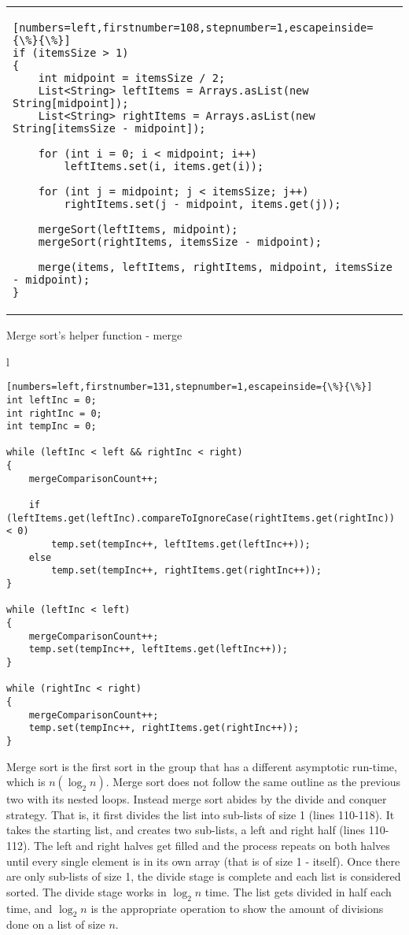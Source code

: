 \documentclass[letterpaper, 10pt,DIV=13]{scrartcl}
\numberwithin{equation}{section} %
\numberwithin{figure}{section} %
\numberwithin{table}{section} %
\begin{document}
\begin{center}
\begin{tabular}{l}
\begin{lstlisting}[numbers=left,firstnumber=108,stepnumber=1,escapeinside={\%}{\%}]
if (itemsSize > 1)
{
    int midpoint = itemsSize / 2;
    List<String> leftItems = Arrays.asList(new String[midpoint]); 
    List<String> rightItems = Arrays.asList(new String[itemsSize - midpoint]);  

    for (int i = 0; i < midpoint; i++)      
        leftItems.set(i, items.get(i));

    for (int j = midpoint; j < itemsSize; j++)          
        rightItems.set(j - midpoint, items.get(j));

    mergeSort(leftItems, midpoint);
    mergeSort(rightItems, itemsSize - midpoint);

    merge(items, leftItems, rightItems, midpoint, itemsSize - midpoint);
}
\end{lstlisting}
\end{tabular}
\end{center}\textbf{}

Merge sort's helper function - merge
\begin{center}
\begin{tabular}{l}
\begin{lstlisting}[numbers=left,firstnumber=131,stepnumber=1,escapeinside={\%}{\%}]
int leftInc = 0;  
int rightInc = 0; 
int tempInc = 0; 

while (leftInc < left && rightInc < right)
{
    mergeComparisonCount++;

    if (leftItems.get(leftInc).compareToIgnoreCase(rightItems.get(rightInc)) < 0)
        temp.set(tempInc++, leftItems.get(leftInc++));
    else
        temp.set(tempInc++, rightItems.get(rightInc++));
}

while (leftInc < left)
{
    mergeComparisonCount++;
    temp.set(tempInc++, leftItems.get(leftInc++));
}

while (rightInc < right)
{
    mergeComparisonCount++;
    temp.set(tempInc++, rightItems.get(rightInc++));
}
\end{lstlisting}
\end{tabular}
\end{center}\textbf{}

Merge sort is the first sort in the group that has a different asymptotic run-time, which is $n({\log_2 n})$.  Merge sort does not follow the same outline as the previous two with its nested loops.  Instead merge sort abides by the divide and conquer strategy.  That is, it first divides the list into sub-lists of size 1 (lines 110-118).  It takes the starting list, and creates two sub-lists, a left and right half (lines 110-112).  The left and right halves get filled and the process repeats on both halves until every single element is in its own array (that is of size 1 - itself).  Once there are only sub-lists of size 1, the divide stage is complete and each list is considered sorted.  The divide stage works in ${\log_2 n}$ time.  The list gets divided in half each time, and ${\log_2 n}$ is the appropriate operation to show the amount of divisions done on a list of size $n$.    
\end{document}
